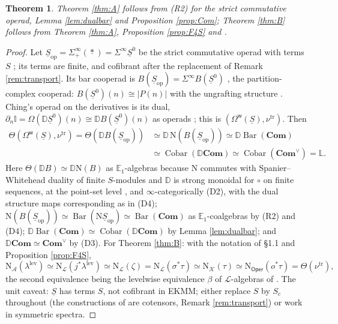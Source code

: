 \documentclass[11pt]{amsart}
\newtheorem{theorem}[subsection]{Theorem}
\theoremstyle{definition}
\theoremstyle{remark}
\newcommand{\Oper}{\mathsf{Oper}}
\newcommand{\Id}{\mathbb{I}}
\newcommand{\pt}{*}
\newcommand{\uS}{\underline{S}}
\newcommand{\uSz}{\underline{S}^{0}}
\newcommand{\Omw}{\Omega^{\mathsf{w}}}
\newcommand{\Kop}{\mathcal{K}}
\newcommand{\Lop}{\mathcal{L}}
\newcommand{\Aop}{\mathcal{A}}
\newcommand{\Lie}{\mathbb{L}}
\newcommand{\Com}{\mathbf{Com}}
\newcommand{\Comv}{\mathbf{Com}^{\vee}}
\newcommand{\dual}{\mathbb{D}}
\newcommand{\BarC}{\operatorname{Bar}}
\newcommand{\Cobar}{\operatorname{Cobar}}
\newcommand{\Lev}{\mathrm{lev}}
\newcommand{\tr}{\mathrm{tr}}
\newcommand{\Nfun}{\mathrm{N}}
\newcommand{\Th}{\Theta}
\begin{document}
\begin{theorem}\label{thm:reduction}
Theorem \ref{thm:A} follows from (R2) for the strict commutative operad, Lemma \ref{lem:dualbar} and Proposition \ref{prop:Com}; Theorem \ref{thm:B} follows from Theorem \ref{thm:A}, Proposition \ref{prop:F4S} and \cite[Theorem 1.3]{Cl2}.
\end{theorem}
\begin{proof}
Let $\uS_{\mathrm{op}}=\Sigma^\infty_+(\underline{\pt})=\Sigma^\infty\uSz$ be the strict commutative operad with terms $S$ \cite[Definition 8.5, Remark 6.6]{Ch05}; its terms are finite, and cofibrant after the replacement of Remark \ref{rem:transport}. Its bar cooperad is $B(\uS_{\mathrm{op}})=\Sigma^\infty B(\uSz)$ \cite[Remark 6.6]{Ch05}, the partition-complex cooperad: $B(\uSz)(n)\cong|P(n)|$ with the ungrafting structure \cite[Lemma 8.6, Example 7.11]{Ch05}. Ching's operad on the derivatives is its dual, $\partial_n\Id=\Omega(\dual\uSz)(n)\cong\dual B(\uSz)(n)$ as operads \cite[Proposition 6.4, Remark 6.5, Corollary 8.8, Remark 8.9]{Ch05}; this is $(\Omw(\uS),\nu^{\tr})$. Then
\begin{align*} \Th(\Omw(\uS),\nu^{\tr})=\Th(\dual B(\uS_{\mathrm{op}}))&\simeq\dual\,\Nfun(B(\uS_{\mathrm{op}}))\simeq\dual\BarC(\Com)\\ &\simeq\Cobar(\dual\Com)\simeq\Cobar(\Comv)=\Lie. \end{align*}
Here $\Th(\dual B)\simeq\dual\Nfun(B)$ as $\mathbb{E}_1$-algebras because $\Nfun$ commutes with Spanier--Whitehead duality of finite $S$-modules and $\dual$ is strong monoidal for $\circ$ on finite sequences, at the point-set level \cite[Proposition 6.4]{Ch05}, \cite[Remark 1.9]{Ch12} and $\infty$-categorically (D2), with the dual structure maps corresponding as in (D4); $\Nfun(B(\uS_{\mathrm{op}}))\simeq\BarC(\Nfun\uS_{\mathrm{op}})\simeq\BarC(\Com)$ as $\mathbb{E}_1$-coalgebras by (R2) and (D4); $\dual\BarC(\Com)\simeq\Cobar(\dual\Com)$ by Lemma \ref{lem:dualbar}; and $\dual\Com\simeq\Comv$ by (D3). For Theorem \ref{thm:B}: with the notation of \S 1.1 and Proposition \ref{prop:F4S},
\[ \Nfun_{\Aop}(\lambda^{\Lev})\simeq\Nfun_{\Lop}(j^*\lambda^{\Lev})\simeq\Nfun_{\Lop}(\zeta)=\Nfun_{\Lop}(\sigma^*\tau)\simeq\Nfun_{\Kop}(\tau)\simeq\Nfun_{\Oper}(o^*\tau)=\Th(\nu^{\tr}), \]
the second equivalence being the levelwise equivalence $\beta$ of $\Lop$-algebras of \cite[Theorem A.73]{Cl2}. The unit caveat: $\uS$ has terms $S$, not cofibrant in EKMM; either replace $S$ by $S_c$ throughout (the constructions of \cite{Cl2} are cotensors, Remark \ref{rem:transport}) or work in symmetric spectra.
\end{proof}
\end{document}
